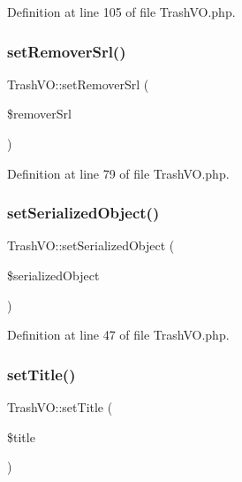 Definition at line 105 of file Trash\+V\+O.\+php.

\mbox{\label{classTrashVO_a3bd22cfa2e432561f1fc50dfcdeb4983}} 
\subsubsection{\texorpdfstring{set\+Remover\+Srl()}{setRemoverSrl()}}
{\footnotesize\ttfamily Trash\+V\+O\+::set\+Remover\+Srl (\begin{DoxyParamCaption}\item[{}]{\$remover\+Srl }\end{DoxyParamCaption})}



Definition at line 79 of file Trash\+V\+O.\+php.

\mbox{\label{classTrashVO_a823a0ca9280c9ef91a997fc3e4c3b8ab}} 
\subsubsection{\texorpdfstring{set\+Serialized\+Object()}{setSerializedObject()}}
{\footnotesize\ttfamily Trash\+V\+O\+::set\+Serialized\+Object (\begin{DoxyParamCaption}\item[{}]{\$serialized\+Object }\end{DoxyParamCaption})}



Definition at line 47 of file Trash\+V\+O.\+php.

\mbox{\label{classTrashVO_a39f7c05ef0c9d43122b220969f70b215}} 
\subsubsection{\texorpdfstring{set\+Title()}{setTitle()}}
{\footnotesize\ttfamily Trash\+V\+O\+::set\+Title (\begin{DoxyParamCaption}\item[{}]{\$title }\end{DoxyParamCaption})}



